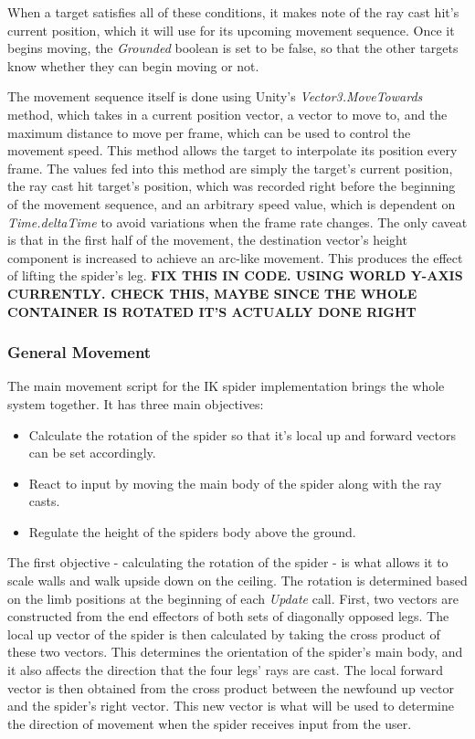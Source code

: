 When a target satisfies all of these conditions, it makes note of the ray cast
hit's current position, which it will use for its upcoming movement sequence.
Once it begins moving, the \textit{Grounded} boolean is set to be false, so that
the other targets know whether they can begin moving or not.

The movement sequence itself is done using Unity's \textit{Vector3.MoveTowards}
method, which takes in a current position vector, a vector to move to, and the
maximum distance to move per frame, which can be used to control the movement
speed. This method allows the target to interpolate its position every frame.
The values fed into this method are simply the target's current position, the
ray cast hit target's position, which was recorded right before the beginning of
the movement sequence, and an arbitrary speed value, which is dependent on
\textit{Time.deltaTime} to avoid variations when the frame rate changes. The
only caveat is that in the first half of the movement, the destination vector's
height component is increased to achieve an arc-like movement. This produces the
effect of lifting the spider's leg. \textbf{FIX THIS IN CODE. USING WORLD Y-AXIS
CURRENTLY. CHECK THIS, MAYBE SINCE THE WHOLE CONTAINER IS ROTATED IT'S ACTUALLY
DONE RIGHT}

\subsubsection{General Movement}
The main movement script for the IK spider implementation brings the whole
system together. It has three main objectives:

\begin{itemize}

    \item Calculate the rotation of the spider so that it's local up and forward
        vectors can be set accordingly.

    \item React to input by moving the main body of the spider along with the
        ray casts.

    \item Regulate the height of the spiders body above the ground.

\end{itemize}

The first objective - calculating the rotation of the spider - is what allows it
to scale walls and walk upside down on the ceiling. The rotation is determined
based on the limb positions at the beginning of each \textit{Update} call.
First, two vectors are constructed from the end effectors of both sets of
diagonally opposed legs. The local up vector of the spider is then calculated by
taking the cross product of these two vectors. This determines the orientation
of the spider's main body, and it also affects the direction that the four legs'
rays are cast. The local forward vector is then obtained from the cross product
between the newfound up vector and the spider's right vector. This new vector is
what will be used to determine the direction of movement when the spider
receives input from the user.

